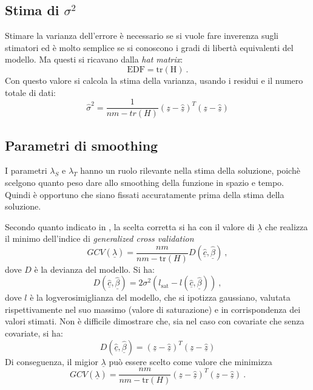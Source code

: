 \documentclass[a4paper,11pt,twoside,openright]{book}							%
\begin{document}
\subsection*{Stima di $\sigma^2$}
Stimare la varianza dell'errore è necessario se si vuole fare inverenza sugli stimatori ed è molto semplice se si conoscono i gradi di libertà equivalenti del modello. Ma questi si ricavano dalla \textit{hat matrix}:
$$
\mathrm{EDF=tr(H)} \ .
$$
Con questo valore si calcola la stima della varianza, usando i residui e il numero totale di dati:
$$
\hat{\sigma}^2=\frac{1}{nm-tr(H)}(\underline z - \hat  {\underline z})^T(\underline z - \hat  {\underline z})
$$

\subsection*{Parametri di smoothing}
I parametri $\lambda_S$ e $\lambda_T$ hanno un ruolo rilevante nella stima della soluzione, poichè scelgono quanto peso dare allo smoothing della funzione in spazio e tempo. Quindi è opportuno che siano fissati accuratamente prima della stima della soluzione.

Secondo quanto indicato in \cite{art:marra}, la scelta corretta si ha con il valore di $\underline \lambda$ che realizza il minimo dell'indice di \textit{generalized cross validation}
$$
GCV(\underline \lambda) =\frac{nm}{nm-\text{tr}(H)}  D(\hat  {\underline c},\hat  {\underline \beta}) \ ,
$$
dove $D$ è la devianza del modello. Si ha:
$$
D(\hat  {\underline c},\hat  {\underline \beta})=2\sigma^2(l_{\mathrm{sat}}-l(\hat  {\underline c},\hat  {\underline \beta})) \ ,
$$
dove $l$ è la logverosimiglianza del modello, che si ipotizza gaussiano, valutata rispettivamente nel suo massimo (valore di saturazione) e in corrispondenza dei valori stimati. Non è difficile dimostrare che, sia nel caso con covariate che senza covariate, si ha: 
$$
D(\hat  {\underline c},\hat  {\underline \beta}) = (\underline z - \hat  {\underline z})^T(\underline z - \hat  {\underline z})
$$
Di conseguenza, il migior $\underline \lambda$ può essere scelto come valore che minimizza
$$
GCV(\underline \lambda) =\frac{nm}{nm-\text{tr}(H)}  (\underline z - \hat  {\underline z})^T(\underline z - \hat  {\underline z}) \ .
$$
\end{document}
